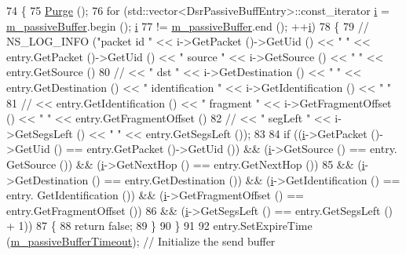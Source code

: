 \begin{DoxyCode}
74 \{
75   \hyperlink{classns3_1_1dsr_1_1DsrPassiveBuffer_a8426eccf47ee009ccedd2f7c224ec203}{Purge} ();
76   \textcolor{keywordflow}{for} (std::vector<DsrPassiveBuffEntry>::const\_iterator \hyperlink{bernuolliDistribution_8m_a6f6ccfcf58b31cb6412107d9d5281426}{i} = \hyperlink{classns3_1_1dsr_1_1DsrPassiveBuffer_ab31ade1fb99b99f777a393ca21162535}{m\_passiveBuffer}.begin (); 
      \hyperlink{bernuolliDistribution_8m_a6f6ccfcf58b31cb6412107d9d5281426}{i}
77        != \hyperlink{classns3_1_1dsr_1_1DsrPassiveBuffer_ab31ade1fb99b99f777a393ca21162535}{m\_passiveBuffer}.end (); ++\hyperlink{bernuolliDistribution_8m_a6f6ccfcf58b31cb6412107d9d5281426}{i})
78     \{
79 \textcolor{comment}{//      NS\_LOG\_INFO ("packet id " << i->GetPacket ()->GetUid () << " " << entry.GetPacket ()->GetUid () <<
       " source " << i->GetSource () << " " << entry.GetSource ()}
80 \textcolor{comment}{//                                     << " dst " << i->GetDestination () << " " << entry.GetDestination ()
       << " identification " << i->GetIdentification () << " "}
81 \textcolor{comment}{//                                     << entry.GetIdentification () << " fragment " <<
       i->GetFragmentOffset () << " " << entry.GetFragmentOffset ()}
82 \textcolor{comment}{//                                     << " segLeft " << i->GetSegsLeft () << " " << entry.GetSegsLeft ());}
83 
84       \textcolor{keywordflow}{if} ((\hyperlink{bernuolliDistribution_8m_a6f6ccfcf58b31cb6412107d9d5281426}{i}->GetPacket ()->GetUid () == entry.GetPacket ()->GetUid ()) && (\hyperlink{bernuolliDistribution_8m_a6f6ccfcf58b31cb6412107d9d5281426}{i}->GetSource () == entry.
      GetSource ()) && (\hyperlink{bernuolliDistribution_8m_a6f6ccfcf58b31cb6412107d9d5281426}{i}->GetNextHop () == entry.GetNextHop ())
85           && (\hyperlink{bernuolliDistribution_8m_a6f6ccfcf58b31cb6412107d9d5281426}{i}->GetDestination () == entry.GetDestination ()) && (\hyperlink{bernuolliDistribution_8m_a6f6ccfcf58b31cb6412107d9d5281426}{i}->GetIdentification () == entry.
      GetIdentification ()) && (\hyperlink{bernuolliDistribution_8m_a6f6ccfcf58b31cb6412107d9d5281426}{i}->GetFragmentOffset () == entry.GetFragmentOffset ())
86           && (\hyperlink{bernuolliDistribution_8m_a6f6ccfcf58b31cb6412107d9d5281426}{i}->GetSegsLeft () == entry.GetSegsLeft () + 1))
87         \{
88           \textcolor{keywordflow}{return} \textcolor{keyword}{false};
89         \}
90     \}
91 
92   entry.SetExpireTime (\hyperlink{classns3_1_1dsr_1_1DsrPassiveBuffer_a80d23b7cccce40b45429d3627f228db0}{m\_passiveBufferTimeout});     \textcolor{comment}{// Initialize the send buffer
}
\end{DoxyCode}
